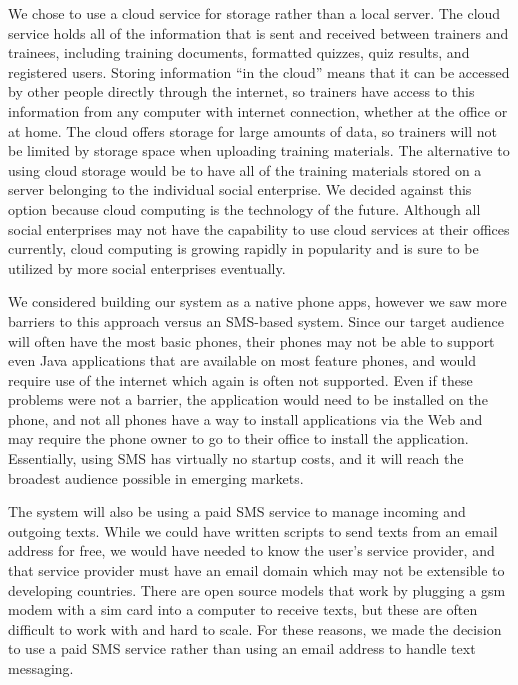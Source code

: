 We chose to use a cloud service for storage rather than a local server. The cloud service holds all of the information that is sent and received between trainers and trainees, including training documents, formatted quizzes, quiz results, and registered users. Storing information “in the cloud” means that it can be accessed by other people directly through the internet, so trainers have access to this information from any computer with internet connection, whether at the office or at home. The cloud offers storage for large amounts of data, so trainers will not be limited by storage space when uploading training materials. The alternative to using cloud storage would be to have all of the training materials stored on a server belonging to the individual social enterprise. We decided against this option because cloud computing is the technology of the future. Although all social enterprises may not have the capability to use cloud services at their offices currently, cloud computing is growing rapidly in popularity and is sure to be utilized by more social enterprises eventually.

We considered building our system as a native phone apps, however we saw more barriers to this approach versus an SMS-based system. Since our target audience will often have the most basic phones, their phones may not be able to support even Java applications that are available on most feature phones, and would require use of the internet which again is often not supported. Even if these problems were not a barrier, the application would need to be installed on the phone, and not all phones have a way to install applications via the Web and may require the phone owner to go to their office to install the application. Essentially, using SMS has virtually no startup costs, and it will reach the broadest audience possible in emerging markets.

The system will also be using a paid SMS service to manage incoming and outgoing texts. While we could have written scripts to send texts from an email address for free, we would have needed to know the user’s service provider, and that service provider must have an email domain which may not be extensible to developing countries. There are open source models that work by plugging a gsm modem with a sim card into a computer to receive texts, but these are often difficult to work with and hard to scale. For these reasons, we made the decision to use a paid SMS service rather than using an email address to handle text messaging.
